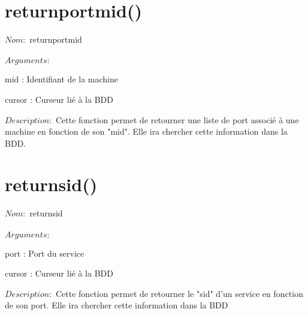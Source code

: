 \documentclass[12pt]{report}
\begin{document}
		\section{returnportmid()}
			{\setlength{\parindent}{0cm}
			$Nom :$ returnportmid\\\\
			}
			$Arguments :$
			\begin{description}
				\item mid : Identifiant de la machine
				\item cursor : Curseur lié à la BDD\\
			\end{description}
			$Description : $ Cette fonction permet de retourner une liste de port associé à une machine en fonction de son "mid". Elle ira chercher cette information dans la BDD.
		\section{returnsid()}
			{\setlength{\parindent}{0cm}
			$Nom :$ returnsid\\\\
			}
			$Arguments :$
			\begin{description}
				\item port : Port du service
				\item cursor : Curseur lié à la BDD\\
			\end{description}
			$Description : $ Cette fonction permet de retourner le "sid" d'un service en fonction de son port. Elle ira chercher cette information dans la BDD
\end{document}
